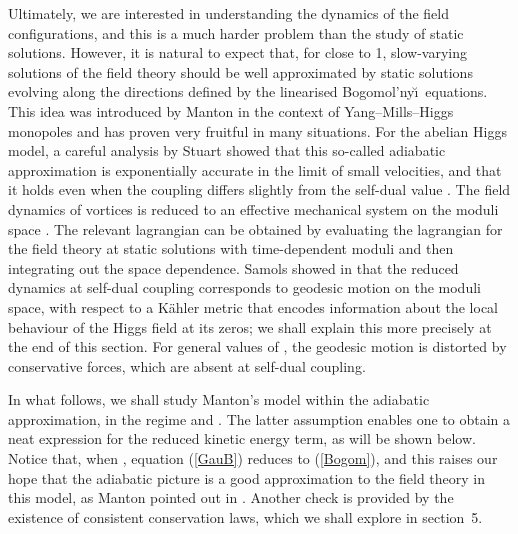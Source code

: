 \documentclass[a4paper,11pt]{article}
\begin{document}
Ultimately, we are interested in understanding the dynamics of the
field configurations, and this is a much harder
problem than the study of static solutions. However, it is natural
to expect that, for \myHighlight{$\lambda$}\coordHE{} close to 1, 
slow-varying solutions of the field theory 
should be well approximated by static solutions evolving along the
directions defined by the linearised Bogomol'ny\u\i\ equations.
This idea was introduced by Manton in the context of
Yang--Mills--Higgs monopoles
\cite{MBPS} and has proven very fruitful in many situations. 
For the abelian Higgs model, %
a careful analysis by Stuart \cite{StuAH} showed that this so-called
adiabatic approximation is exponentially
accurate in the limit of small velocities, and that it holds even when
the coupling differs slightly from the self-dual value \coordHE{}. 
The field dynamics of \coordHE{} vortices is reduced to an effective 
mechanical system on the moduli space \coordHE{}. 
The relevant lagrangian can be obtained by evaluating the 
lagrangian for the field theory at static solutions 
with time-dependent moduli and then integrating out the space dependence.
Samols showed in \cite{Sam} that the reduced dynamics at self-dual coupling 
corresponds to geodesic motion on the moduli space, with respect to a 
K\"ahler metric that encodes information about the local behaviour of the
Higgs field at its zeros; we shall explain this more precisely at the
end of this section.
For general values of \coordHE{}, the geodesic motion is
distorted by conservative forces, which are absent at self-dual coupling.


In what follows, we shall study Manton's model within the adiabatic 
approximation, in
the regime \coordHE{} and \myHighlight{$\gamma=\mu$}\coordHE{}. The latter assumption
enables one to obtain a neat expression for the reduced kinetic energy
term, as will be shown below. Notice that, when 
\myHighlight{$\gamma=\mu$}\coordHE{}, equation (\ref{GauB}) reduces to (\ref{Bogom}), and
this raises our hope that the adiabatic picture is a good
approximation to the field theory in this model, as Manton pointed
out in \cite{Mfovd}. Another check is provided by the existence of
consistent conservation laws, which we shall explore in section~5.
\end{document}
